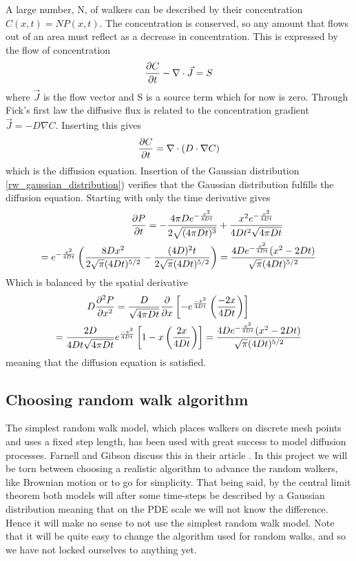 A large number, N, of walkers can be described by their concentration $C(x,t) = NP(x,t)$.
The concentration is conserved, so any amount that flows out of an area must reflect as a decrease in concentration. 
This is expressed by the flow of concentration
\begin{equation}
 \frac{\partial C}{\partial t} -\nabla\cdot\vec{J} = S
\end{equation}
where $\vec{J}$ is the flow vector and S is a source term which for now is zero.
Through Fick's first law the diffusive flux is related to the concentration gradient $\vec{J} = -D\nabla C$. 
Inserting this gives
\begin{equation}\label{simple_diffusion_equation}
 \frac{\partial C}{\partial t} = \nabla\cdot \left(D\cdot\nabla C\right)
\end{equation}
which is the diffusion equation.
Insertion of the Gaussian distribution \eqref{rw_gaussian_distribution}) verifies that the Gaussian distribution fulfills the diffusion equation. 
Starting with only the time derivative gives
\begin{align*}
 \frac{\partial P}{\partial t} = -\frac{4\pi De^{-\frac{x^2}{4Dt}}}{2\sqrt{(4\pi Dt)^3}}&+\frac{x^2e^{-\frac{x^2}{4Dt}}}{4Dt^2\sqrt{4\pi Dt}} \\
 = e^{-\frac{x^2}{4Dt}}\left(\frac{8Dx^2}{2\sqrt{\pi}(4Dt)^{5/2}} -\frac{(4D)^2t}{2\sqrt{\pi}(4Dt)^{5/2}}\right)&= \frac{4De^{-\frac{x^2}{4Dt}}(x^2-2Dt)}{\sqrt{\pi}(4Dt)^{5/2}}
\end{align*}
 Which is balanced by the spatial derivative
\begin{align*}
 D\frac{\partial^2 P}{\partial x^2} &= \frac{D}{\sqrt{4\pi Dt}}\frac{\partial}{\partial x}\left[-e^{\frac{-x^2}{4Dt}}\left(\frac{-2x}{4Dt}\right)\right]\\
 = \frac{2D}{4Dt\sqrt{4\pi Dt}}&e^{\frac{-x^2}{4Dt}}\left[1-x\left(\frac{2x}{4Dt}\right)\right] = \frac{4De^{-\frac{x^2}{4Dt}}(x^2-2Dt)}{\sqrt{\pi}(4Dt)^{5/2}}
\end{align*}
meaning that the diffusion equation is satisfied.

\subsection{Choosing random walk algorithm}\label{choosing_random_walk_algorithm}

The simplest random walk model, which places walkers on discrete mesh points and uses a fixed step length, has been used with great success to model diffusion processes. 
Farnell and Gibson discuss this in their article \cite{farnell2005monte}. 
In this project we will be torn between choosing a realistic algorithm to advance the random walkers, like Brownian motion or to go for simplicity. 
That being said, by the central limit theorem both models will after some time-steps be described by a Gaussian distribution meaning that on the PDE scale we will not know the difference. 
Hence it will make no sense to not use the simplest random walk model.
Note that it will be quite easy to change the algorithm used for random walks, and so we have not locked ourselves to anything yet.

